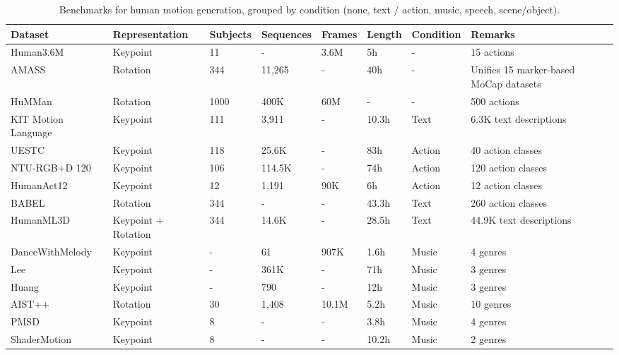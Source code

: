 \begin{table}[htbp]
\centering
\fontsize{8}{10}\selectfont
\setlength{\tabcolsep}{1.2mm}
\caption{Benchmarks for human motion generation, grouped by condition (none, text / action, music, speech, scene/object).}
\label{tab:p3_s8_4_1_datasets}
\begin{tabular}{L{0.18\textwidth} C{0.115\textwidth} C{0.07\textwidth} C{0.08\textwidth} C{0.06\textwidth} C{0.06\textwidth} C{0.13\textwidth} L{0.17\textwidth}}
\toprule
\textbf{Dataset} & \textbf{Representation} & \textbf{Subjects} & \textbf{Sequences} & \textbf{Frames} & \textbf{Length} & \textbf{Condition} & \textbf{Remarks} \\
\midrule
Human3.6M \cite{IonescuPOS14} & Keypoint & 11 & - & 3.6M & 5h & - & 15 actions \\
AMASS \cite{mahmood2019amass} & Rotation & 344 & 11,265 & - & 40h & - & Unifies 15 marker-based MoCap datasets \\
HuMMan \cite{CaiRZLYWFGYPHZL22} & Rotation & 1000 & 400K & 60M & - & - & 500 actions \\
KIT Motion Language \cite{PlappertMA16} & Keypoint & 111 & 3,911 & - & 10.3h & Text & 6.3K text descriptions \\
UESTC \cite{JiXYSSZ18} & Keypoint & 118 & 25.6K & - & 83h & Action & 40 action classes \\
NTU-RGB+D 120 \cite{LiuSPWDK20} & Keypoint & 106 & 114.5K & - & 74h & Action & 120 action classes \\
HumanAct12 \cite{GuoZWZSDG020} & Keypoint & 12 & 1,191 & 90K & 6h & Action & 12 action classes \\
BABEL \cite{PunnakkalCAQB21} & Rotation & 344 & - & - & 43.3h & Text & 260 action classes \\
HumanML3D \cite{GuoZZ0JL022} & Keypoint + Rotation & 344 & 14.6K & - & 28.5h & Text & 44.9K text descriptions \\
DanceWithMelody \cite{TangJM18} & Keypoint & - & 61 & 907K & 1.6h & Music & 4 genres \\
Lee \cite{LeeY0WLYK19} & Keypoint & - & 361K & - & 71h & Music & 3 genres \\
Huang \cite{HuangHWSZJ21} & Keypoint & - & 790 & - & 12h & Music & 3 genres\\
AIST++ \cite{LiYRK21} & Rotation & 30 & 1,408 & 10.1M & 5.2h & Music & 10 genres \\
PMSD \cite{PerezHBHOA21} & Keypoint & 8 & - & - & 3.8h & Music & 4 genres \\
ShaderMotion \cite{PerezHBHOA21} & Keypoint & 8 & - & - & 10.2h & Music & 2 genres \\

\end{tabular}
\end{table}
